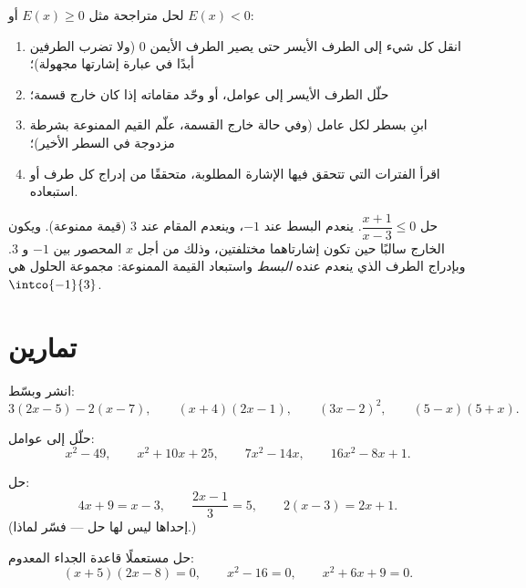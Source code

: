 \begin{method}\label{met:g10:algebra:signtable}
لحل متراجحة مثل $E(x) \geq 0$ أو $E(x) < 0$:
\begin{enumerate}
  \item انقل كل شيء إلى الطرف الأيسر حتى يصير الطرف الأيمن
        $0$ (ولا تضرب الطرفين أبدًا في عبارة إشارتها
        مجهولة)؛
  \item حلّل الطرف الأيسر إلى عوامل، أو وحّد مقاماته إذا
        كان خارج قسمة؛
  \item ابنِ  بسطر لكل عامل (وفي حالة خارج القسمة، علّم
        القيم الممنوعة بشرطة مزدوجة في السطر الأخير)؛
  \item اقرأ الفترات التي تتحقق فيها الإشارة المطلوبة، متحققًا
        من إدراج كل طرف أو استبعاده.
\end{enumerate}
\end{method}

\begin{example}\label{ex:g10:algebra:quotientineq}
حل $\dfrac{x + 1}{x - 3} \leq 0$. ينعدم البسط عند $-1$، وينعدم
المقام عند $3$ (قيمة ممنوعة). ويكون الخارج سالبًا حين تكون
إشارتاهما مختلفتين، وذلك من أجل $x$ المحصور بين $-1$ و $3$.
وبإدراج الطرف الذي ينعدم عنده \emph{البسط} واستبعاد
القيمة الممنوعة: مجموعة الحلول هي $\intco{-1}{3}$.
\end{example}

\section{تمارين}

\begin{exercise}[$\star$]\label{exo:g10:algebra:1}
انشر وبسّط:
\[
3(2x - 5) - 2(x - 7), \qquad
(x + 4)(2x - 1), \qquad
(3x - 2)^2, \qquad
(5 - x)(5 + x).
\]
\end{exercise}

\begin{exercise}[$\star$]\label{exo:g10:algebra:2}
حلّل إلى عوامل:
\[
x^2 - 49, \qquad
x^2 + 10x + 25, \qquad
7x^2 - 14x, \qquad
16x^2 - 8x + 1 .
\]
\end{exercise}

\begin{exercise}[$\star$]\label{exo:g10:algebra:3}
حل:
\[
4x + 9 = x - 3, \qquad
\frac{2x - 1}{3} = 5, \qquad
2(x - 3) = 2x + 1 .
\]
(إحداها ليس لها حل --- فسّر لماذا.)
\end{exercise}

\begin{exercise}[$\star$]\label{exo:g10:algebra:4}
حل مستعملًا قاعدة الجداء المعدوم:
\[
(x + 5)(2x - 8) = 0, \qquad
x^2 - 16 = 0, \qquad
x^2 + 6x + 9 = 0 .
\]
\end{exercise}

